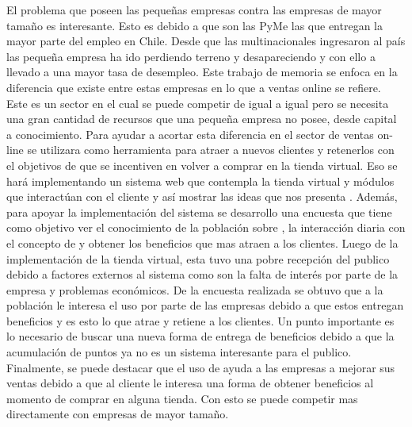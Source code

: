El problema que poseen las pequeñas empresas contra las empresas de mayor tamaño es interesante. Esto es debido
a que son las PyMe las que entregan la mayor parte del empleo en Chile. Desde que las multinacionales ingresaron
al país las pequeña empresa ha ido perdiendo terreno y desapareciendo y con ello a llevado a una mayor tasa de 
desempleo.
Este trabajo de memoria se enfoca en la diferencia que existe entre estas empresas en lo que a ventas online
se refiere. Este es un sector en el cual se puede competir de igual a igual pero se necesita una gran cantidad de 
recursos que una pequeña empresa no posee, desde capital a conocimiento. 
Para ayudar a acortar esta diferencia en el sector de ventas on-line se utilizara {\gam} como herramienta para
atraer a nuevos clientes y retenerlos con el objetivos de que se incentiven en volver a comprar en la tienda virtual. 
Eso se hará implementando un sistema web que contempla la tienda virtual y módulos que interactúan con el cliente 
y así mostrar las ideas que nos presenta {\gam}. Además, para apoyar la implementación del sistema se desarrollo
una encuesta que tiene como objetivo ver el conocimiento de la población sobre {\gam}, la interacción diaria con el 
concepto de {\gam} y obtener los beneficios que mas atraen a los clientes.
Luego de la implementación de la tienda virtual, esta tuvo una pobre recepción del publico debido a factores
externos al sistema como son la falta de interés por parte de la empresa y problemas económicos. De la encuesta
realizada se obtuvo que a la población le interesa el uso {\gam} por parte de las empresas debido a que estos
entregan beneficios y es esto lo que atrae y retiene a los clientes. Un punto importante es lo necesario
de buscar una nueva forma de entrega de beneficios debido a que la acumulación de puntos ya no es un sistema 
interesante para el publico.
Finalmente, se puede destacar que el uso de {\gam} ayuda a las empresas a mejorar sus ventas debido a que al 
cliente le interesa una forma de obtener beneficios al momento de comprar en alguna tienda. Con esto se puede
competir mas directamente con empresas de mayor tamaño.
